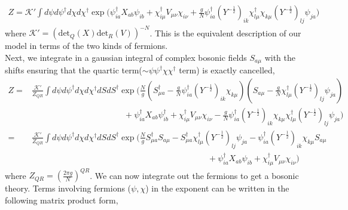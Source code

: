 \documentclass[english]{article}
\newcommand{\half}{\frac{1}{2}}
\renewcommand{\>}{\rangle}
\newcommand{\<}{\langle}
\renewcommand{\(}{\left(}
\renewcommand{\)}{\right)}
\begin{document}
\begin{align}\label{fullyfermion}
    Z=\mathcal{K}'\int d\psi d\psi^{\dagger}d\chi d\chi^{\dagger}\exp\bigg(\psi^{\dagger}_{ia}X_{ab}\psi_{ib}+\chi^{\dagger}_{i\mu}V_{\mu\nu}\chi_{i\nu}+\frac{g}{N}\psi^{\dagger}_{ia}(Y^{-\half})_{ik}\chi_{l\mu}^{\dagger}\chi_{k\mu}(Y^{-\half})_{lj}\psi_{ja}\bigg)
\end{align}
where $\mathcal{K}'=(\text{det}_Q(X)\text{det}_R(V))^{-N}$. This is the equivalent description of our model in terms of the two kinds of fermions. \\
Next, we integrate in a gaussian integral of complex bosonic fields $S_{a\mu}$ with the shifts ensuring that the quartic term($\sim \psi\psi^{\dagger}\chi\chi^{\dagger}$ term) is exactly cancelled, 
\begin{align}\label{fermionic+bosonic}
Z=&\frac{\mathcal{K}'}{Z_{QR}}\int d\psi d\psi^{\dagger}d\chi d\chi^{\dagger}d S dS^{\dagger}\exp\bigg( \frac{N}{g}(S^{\dagger}_{\mu a}-\frac{g}{N}\psi_{ia}^{\dagger}(Y^{-\half})_{ik}\chi_{k\mu})(S_{a\mu}-\frac{g}{N}\chi^{\dagger}_{l\mu}(Y^{-\half})_{lj}\psi_{ja})  \nonumber\\
&\qquad\quad\qquad\qquad\qquad\qquad+\psi^{\dagger}_{ia}X_{ab}\psi^{\dagger}_{ib}+\chi^{\dagger}_{i\mu}V_{\mu\nu}\chi_{i\nu}-\frac{g}{N}\psi^{\dagger}_{ia}(Y^{-\half})_{ik}\chi_{k\mu}\chi_{l\mu}^{\dagger}(Y^{-\half})_{lj}\psi_{ja}\bigg)\nonumber\\
=&\frac{\mathcal{K}'}{Z_{QR}}\int d\psi d\psi^{\dagger}d\chi d\chi^{\dagger}d S dS^{\dagger}\exp\bigg( \frac{N}{g}S^{\dagger}_{\mu a}S_{a\mu}-S^{\dagger}_{\mu a}\chi^{\dagger}_{l\mu}(Y^{-\half})_{lj}\psi_{ja}-\psi_{ia}^{\dagger}(Y^{-\half})_{ik}\chi_{k\mu}S_{a\mu} \nonumber\\ &\qquad\qquad\qquad\qquad\qquad\qquad\qquad\qquad\qquad\qquad\quad+\psi^{\dagger}_{ia}X_{ab}\psi_{ib}+\chi^{\dagger}_{i\mu}V_{\mu\nu}\chi_{i\nu}\bigg)
\end{align}
where $Z_{QR}= (\frac{2\pi g}{N})^{QR}$. We can now integrate out the fermions to get a bosonic theory. Terms involving fermions ($\psi, \chi$) in the exponent can be written in the following matrix product form,
\end{document}
